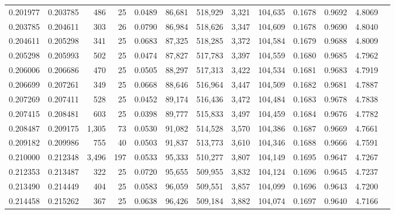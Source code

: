 \begin{tabular}{rrrrrrrrrrrrr}
0.201977 & 0.203785 &   486 &  25 &                                     0.0489 &  86,681 & 518,929 &   3,321 & 104,635 & 0.1678 & 0.9692 & 4.8069 \\
0.203785 & 0.204611 &   303 &  26 &                                     0.0790 &  86,984 & 518,626 &   3,347 & 104,609 & 0.1678 & 0.9690 & 4.8040 \\
0.204611 & 0.205298 &   341 &  25 &                                     0.0683 &  87,325 & 518,285 &   3,372 & 104,584 & 0.1679 & 0.9688 & 4.8009 \\
0.205298 & 0.205993 &   502 &  25 &                                     0.0474 &  87,827 & 517,783 &   3,397 & 104,559 & 0.1680 & 0.9685 & 4.7962 \\
0.206006 & 0.206686 &   470 &  25 &                                     0.0505 &  88,297 & 517,313 &   3,422 & 104,534 & 0.1681 & 0.9683 & 4.7919 \\
0.206699 & 0.207261 &   349 &  25 &                                     0.0668 &  88,646 & 516,964 &   3,447 & 104,509 & 0.1682 & 0.9681 & 4.7887 \\
0.207269 & 0.207411 &   528 &  25 &                                     0.0452 &  89,174 & 516,436 &   3,472 & 104,484 & 0.1683 & 0.9678 & 4.7838 \\
0.207415 & 0.208481 &   603 &  25 &                                     0.0398 &  89,777 & 515,833 &   3,497 & 104,459 & 0.1684 & 0.9676 & 4.7782 \\
0.208487 & 0.209175 & 1,305 &  73 &                                     0.0530 &  91,082 & 514,528 &   3,570 & 104,386 & 0.1687 & 0.9669 & 4.7661 \\
0.209182 & 0.209986 &   755 &  40 &                                     0.0503 &  91,837 & 513,773 &   3,610 & 104,346 & 0.1688 & 0.9666 & 4.7591 \\
0.210000 & 0.212348 & 3,496 & 197 &                                     0.0533 &  95,333 & 510,277 &   3,807 & 104,149 & 0.1695 & 0.9647 & 4.7267 \\
0.212353 & 0.213487 &   322 &  25 &                                     0.0720 &  95,655 & 509,955 &   3,832 & 104,124 & 0.1696 & 0.9645 & 4.7237 \\
0.213490 & 0.214449 &   404 &  25 &                                     0.0583 &  96,059 & 509,551 &   3,857 & 104,099 & 0.1696 & 0.9643 & 4.7200 \\
0.214458 & 0.215262 &   367 &  25 &                                     0.0638 &  96,426 & 509,184 &   3,882 & 104,074 & 0.1697 & 0.9640 & 4.7166 \\

\end{tabular}
